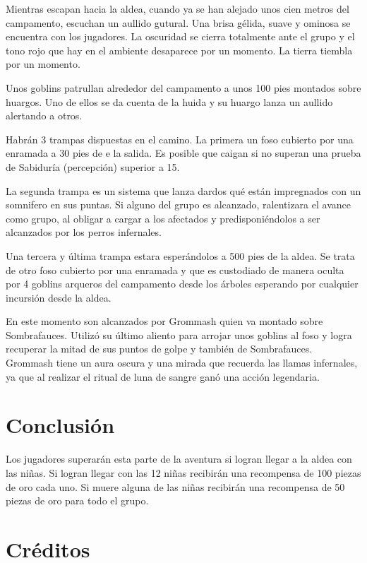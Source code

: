\documentclass[10pt,twoside,twocolumn,openany]{dndbook}
\begin{document}
\begin{DndReadAloud}
Mientras escapan hacia la aldea, cuando ya se han alejado unos cien metros del campamento, escuchan 
un aullido gutural. Una brisa gélida, suave y ominosa se encuentra con los jugadores. La oscuridad
se cierra totalmente ante el grupo y el tono rojo que hay en el ambiente desaparece por un momento.
La tierra tiembla por un momento.
\end{DndReadAloud}

Unos goblins patrullan alrededor del campamento a unos 100 pies montados sobre huargos. Uno de ellos
se da cuenta de la huida y su huargo lanza un aullido alertando a otros.

Habrán 3 trampas dispuestas en el camino. La primera un foso cubierto por una enramada a 30 pies de e
la salida. Es posible que caigan si no superan una prueba de Sabiduría (percepción) superior a 15.

La segunda trampa es un sistema que lanza dardos qué están impregnados con un somnifero en sus puntas. 
Si alguno del grupo es alcanzado, ralentizara el avance como grupo, al obligar a cargar a los afectados 
y predisponiéndolos a ser alcanzados por los perros infernales.

Una tercera y última trampa estara esperándolos a 500 pies de la aldea. Se trata de otro foso cubierto
por una enramada y que es custodiado de manera oculta por 4 goblins arqueros del campamento desde los 
árboles esperando por cualquier incursión desde la aldea. 

En este momento son alcanzados por Grommash quien va montado sobre Sombrafauces. Utilizó su último 
aliento para arrojar unos goblins al foso y logra recuperar la mitad de sus puntos de golpe y también de 
Sombrafauces. Grommash tiene un aura oscura y una mirada que recuerda las llamas infernales, ya que al 
realizar el ritual de luna de sangre ganó una acción legendaria.

\section{Conclusión}

Los jugadores superarán esta parte de la aventura si logran llegar a la aldea con las niñas. Si logran 
llegar con las 12 niñas recibirán una recompensa de 100 piezas de oro cada uno. Si muere alguna de las 
niñas recibirán una recompensa de 50 piezas de oro para todo el grupo.

\section{Créditos}
\end{document}
